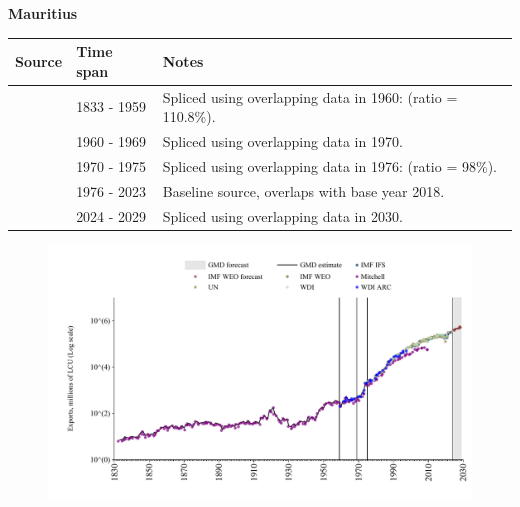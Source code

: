 \documentclass[12pt,a4paper,landscape]{article}
\begin{document}
\begin{adjustbox}{max totalsize={\paperwidth}{\paperheight},center}
\begin{minipage}[t][\textheight][t]{\textwidth}
\vspace*{0.5cm}
{}
\begin{center}
{\Large\bfseries Mauritius}
\end{center}
\vspace{0.5cm}
\begin{table}[H]
\centering
\small
\begin{tabular}{|l|l|l|}
\hline
\textbf{Source} & \textbf{Time span} & \textbf{Notes} \\
\hline
\rowcolor{white}\cite{Mitchell}& 1833 - 1959 &Spliced using overlapping data in 1960: (ratio = 110.8\%).\\
\rowcolor{lightgray}\cite{WDI_ARC}& 1960 - 1969 &Spliced using overlapping data in 1970.\\
\rowcolor{white}\cite{UN}& 1970 - 1975 &Spliced using overlapping data in 1976: (ratio = 98\%).\\
\rowcolor{lightgray}\cite{WDI}& 1976 - 2023 &Baseline source, overlaps with base year 2018.\\
\rowcolor{white}\cite{IMF_WEO_forecast}& 2024 - 2029 &Spliced using overlapping data in 2030.\\
\hline
\end{tabular}
\end{table}
\begin{figure}[H]
\centering
\includegraphics[width=\textwidth,height=0.6\textheight,keepaspectratio]{graphs/MUS_exports.pdf}
\end{figure}
\end{minipage}
\end{adjustbox}
\end{document}

